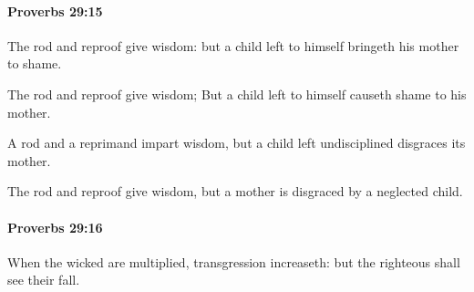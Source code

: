 		\paragraph{Proverbs 29:15} %
			\label{PROVERBS-29-15}

			The rod and reproof give wisdom: but a child left to himself bringeth his mother to shame.

			\begin{versebox}
					\item[BHS] 
					\item[ASV] The rod and reproof give wisdom; But a child left to himself causeth shame to his mother.
					\item[NIV] A rod and a reprimand impart wisdom, but a child left undisciplined disgraces its mother.
					\item[NRSV] The rod and reproof give wisdom, but a mother is disgraced by a neglected child.
			\end{versebox}

		\paragraph{Proverbs 29:16} %
			\label{PROVERBS-29-16}

			When the wicked are multiplied, transgression increaseth: but the righteous shall see their fall.

